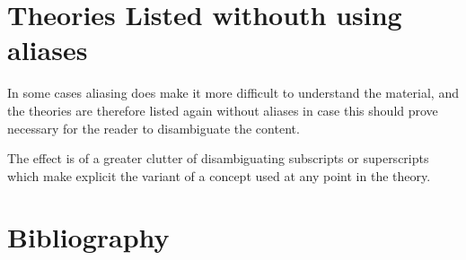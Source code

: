 \section{Theories Listed withouth using aliases}\label{TheoryListingsWithoutAliases}

In some cases aliasing does make it more difficult to understand the material, and the theories are therefore listed again without aliases in case this should prove necessary for the reader to disambiguate the content.

The effect is of a greater clutter of disambiguating subscripts or superscripts which make explicit the variant of a concept used at any point in the theory.

{
\let\Section\subsection
\let\Subsection\subsubsection
\def\subsection#1{\Subsection*{#1}}

\def\section#1{\Section{#1}\label{t045na}}

\def\section#1{\Section{#1}\label{t045qna}}

\def\section#1{\Section{#1}\label{t045kna}}

\def\section#1{\Section{#1}\label{t045wna}}

}  %

\pagebreak

\section*{Bibliography}\label{BIBLIOGRAPHY}

{\def\section*#1{\ignore{#1}}
\raggedright


} %

{
{\small\printindex}}


